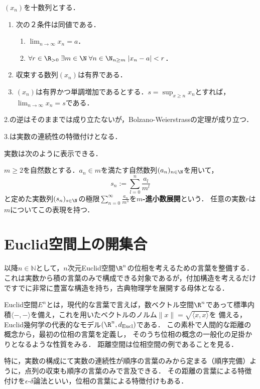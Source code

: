 \documentclass[uplatex,dvipdfmx]{jsreport}
\begin{document}
\begin{proposition}$(x_n)$を十数列とする．
    \begin{enumerate}
        \item 次の２条件は同値である．
        \begin{enumerate}[(1)]
            \item $\lim_{n\to\infty}x_n=a$．
            \item $\forall r\in\R_{>0}\; \exists m\in\N \; \forall n\in\N_{n\ge m} \; |x_n-a|<r$．
        \end{enumerate}
        \item 収束する数列$(x_n)$は有界である．
        \item  $(x_n)$は有界かつ単調増加であるとする．$s=\sup_{x\ge n}x_n$とすれば，$\lim_{n\to\infty}x_n=s$である．
    \end{enumerate}
\end{proposition}
\begin{remark}
    2.の逆はそのままでは成り立たないが，Bolzano-Weierstrassの定理が成り立つ．

    3.は実数の連続性の特徴付けとなる．
\end{remark}

実数は次のように表示できる．
\begin{definition}
    $m\ge 2$を自然数とする．$a_n\in m$を満たす自然数列$(a_n)_{n\in\N}$を用いて，
    \[ s_n:=\sum^n_{l=0}\frac{a_l}{m^l} \]
    と定めた実数列$(s_n)_{s\in\N}$の極限$\sum^\infty_{n=0}\frac{a_n}{m^n}$を\textbf{$m$-進小数展開}という．
    任意の実数$r$は$m$についてこの表現を持つ．
\end{definition}

\section{Euclid空間上の開集合}

\begin{screen}
    以降$n\in\mathbb{N}$として，$n$次元Euclid空間$\R^n$の位相を考えるための言葉を整備する．
    これは実数から積の言葉のみで構成できる対象であるが，付加構造を考えるだけですでに非常に豊富な構造を持ち，古典物理学を展開する母体となる．

    Euclid空間$E^n$とは，現代的な言葉で言えば，数ベクトル空間$\R^n$であって標準内積$\langle -,-\rangle$を備え，これを用いたベクトルのノルム$\|x\|=\sqrt{\langle x,x\rangle}$を
    備える，Euclid幾何学の代表的なモデル$(\R^n,d_{\mathrm{Eucl}})$である．
    この素朴で人間的な距離の概念から，最初の位相の言葉を定義し，
    そのうち位相の概念の一般化の足掛かりとなるような性質をみる．
    距離空間は位相空間の例であることを見る．

    特に，実数の構成にて実数の連続性が順序の言葉のみから定まる（順序完備）ように，点列の収束も順序の言葉のみで言及できる．
    その距離の言葉による特徴付けを$\epsilon$-$\delta$論法といい，位相の言葉による特徴付けもある．
\end{screen}
\end{document}
